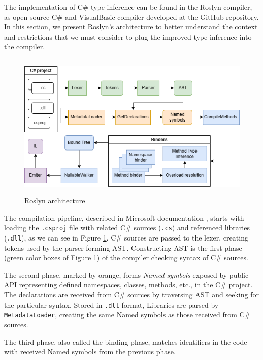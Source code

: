 The implementation of C\# type inference can be found in the Roslyn compiler, as open-source C\# and VisualBasic compiler developed at the GitHub repository. 
In this section, we present Roslyn’s architecture to better understand the context and restrictions that we must consider to plug the improved type inference into the compiler.
\par
\begin{figure}
\centering
\includegraphics[width=120mm, height=70mm]{./img/Roslyn_Arch.png}
\caption{Roslyn architecture}
\label{img56:roslynPip}
\end{figure}
\par
{}
The compilation pipeline, described in Microsoft documentation \cite{online:roslynArchitecture}, starts with loading the \texttt{.csproj} file with related C\# sources (\texttt{.cs}) and referenced libraries (\texttt{.dll}), as we can see in Figure \ref{img56:roslynPip}.
C\# sources are passed to the lexer, creating tokens used by the parser forming \ac{AST}.
Constructing \ac{AST} is the first phase (green color boxes of Figure \ref{img56:roslynPip}) of the compiler checking syntax of C\# sources.
\par
{}
The second phase, marked by orange, forms \emph{Named symbols} exposed by public API representing defined namespaces, classes, methods, etc., in the C\# project. 
The declarations are received from C\# sources by traversing AST and seeking for the particular syntax. Stored in \texttt{.dll} format, Libraries are parsed by \texttt{MetadataLoader}, creating the same Named symbols as those received from C\# sources.
\par
{}
The third phase, also called the binding phase, matches identifiers in the code with received Named symbols from the previous phase. 
